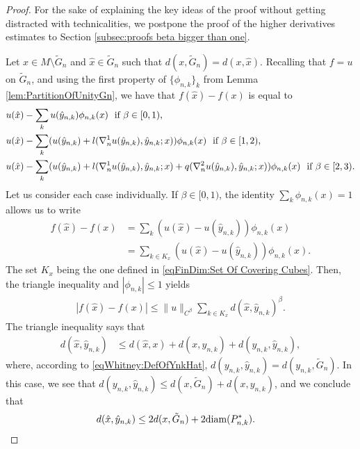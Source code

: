 \documentclass[11pt,reqno]{amsart}
\numberwithin{equation}{section}
\theoremstyle{plain}
\def\diam{\textnormal{diam}}
\begin{document}
\begin{proof}
    For the sake of explaining the key ideas of the proof without getting distracted with technicalities, we postpone the proof of the higher derivatives estimates to Section \ref{subsec:proofs beta bigger than one}. 	

  Let $x \in M\setminus \tilde G_n$ and $\hat x \in \tilde G_n$ such that $d(x,\tilde G_n)=d(x,\hat x)$. Recalling that $f = u$ on $\tilde G_n$, and using the first property of $\{\phi_{n,k}\}_k$ from Lemma \ref{lem:PartitionOfUnityGn}, we have that $f(\hat x)-f(x)$ is equal to 	
    \begin{align*}		
      & u(\hat x)- \sum \limits_{k} u(\hat y_{n,k})\phi_{n,k}(x) \ \textnormal{ if } \beta \in [0,1),\\	
      & u(\hat x)- \sum \limits_{k} (u(\hat y_{n,k})+l(\nabla_n^1u(\hat y_{n,k}),\hat y_{n,k};x ))\phi_{n,k}(x) \ \textnormal{ if } \beta \in [1,2),\\
      & u(\hat x)- \sum \limits_{k} (u(\hat y_{n,k})+l(\nabla_n^1u(\hat y_{n,k}),\hat y_{n,k};x )+q(\nabla_n^2u(\hat y_{n,k}),\hat y_{n,k};x ) )\phi_{n,k}(x) \ \textnormal{ if } \beta \in [2,3).	  
    \end{align*}	  
   Let us consider each case individually. If $\beta \in [0,1)$, the identity $\sum \limits_k \phi_{n,k}(x)=1$ allows us to write 
   \begin{align*}	  
      f(\hat x)-f(x) & = \sum \limits_{k} (u(\hat x)-u(\hat y_{n,k}))\phi_{n,k}(x)\\
  	  & = \sum \limits_{k\in K_x} (u(\hat x)-u(\hat y_{n,k}))\phi_{n,k}(x). 
    \end{align*}
    The set $K_x$ being the one defined in \eqref{eqFinDim:Set Of Covering Cubes}. Then, the triangle inequality and $|\phi_{n,k}|\leq 1$ yields
    \begin{align*}
      |f(\hat x)-f(x)| \leq \|u\|_{C^\beta}\sum \limits_{k\in K_x} d(\hat x,\hat y_{n,k})^{\beta}.
    \end{align*}
    The triangle inequality says that
    \begin{align*}	 
      d(\hat x,\hat y_{n,k}) & \leq d(\hat x,x)+d(x,y_{n,k})+d(y_{n,k},\hat y_{n,k}),
    \end{align*}
    where, according to \eqref{eqWhitney:DefOfYnkHat}, $d(y_{n,k},\hat y_{n,k}) = d(y_{n,k}, \tilde G_n)$. In this case, we see that $d(y_{n,k},\hat y_{n,k})\leq d(x,\tilde G_n)+d(x,y_{n,k})$, and we conclude that
    \begin{align*}		  
      d(\hat x,\hat y_{n,k})  & \leq 2d(x,\tilde G_n)+2\diam(P_{n,k}^*).					

\end{align*}
\end{proof}
\end{document}
